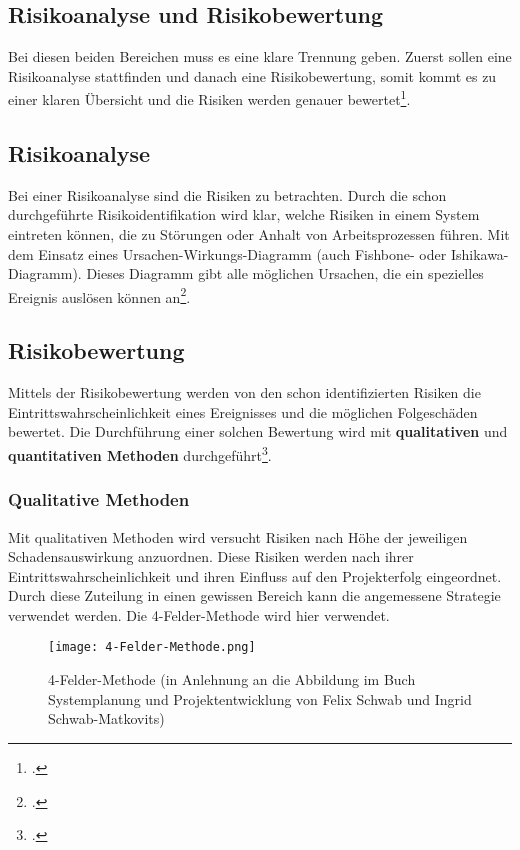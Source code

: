 \subsection{Risikoanalyse und Risikobewertung}
Bei diesen beiden Bereichen muss es eine klare Trennung geben. Zuerst sollen eine Risikoanalyse stattfinden und danach eine Risikobewertung, somit kommt es zu einer klaren Übersicht und die Risiken werden genauer bewertet\footcite{risikoanalyse}.


\subsection{Risikoanalyse}
Bei einer Risikoanalyse sind die Risiken zu betrachten. Durch die schon durchgeführte Risikoidentifikation wird klar, welche Risiken in einem System eintreten können, die zu Störungen oder Anhalt von Arbeitsprozessen führen. Mit dem Einsatz eines Ursachen-Wirkungs-Diagramm (auch Fishbone- oder Ishikawa-Diagramm). Dieses Diagramm gibt alle möglichen Ursachen, die ein spezielles Ereignis auslösen können an\footcite{risikomanagement-diplomarbeit}.


\subsection{Risikobewertung}
Mittels der Risikobewertung werden von den schon identifizierten Risiken die Eintrittswahrscheinlichkeit eines Ereignisses und die möglichen Folgeschäden bewertet. Die Durchführung einer solchen Bewertung wird mit \textbf{qualitativen} und \textbf{quantitativen Methoden} durchgeführt\footcite{risikomanagement-diplomarbeit}.

\subsubsection{Qualitative Methoden}
Mit qualitativen Methoden wird versucht Risiken nach Höhe der jeweiligen Schadensauswirkung anzuordnen.
Diese Risiken werden nach ihrer Eintrittswahrscheinlichkeit und ihren Einfluss auf den Projekterfolg eingeordnet. Durch diese Zuteilung in einen gewissen Bereich kann die angemessene Strategie verwendet werden. Die 4-Felder-Methode wird hier verwendet.

\begin{center}
\begin{figure}[H]
    \centering
    \texttt{[image: 4-Felder-Methode.png]}
    \caption{4-Felder-Methode (in Anlehnung an die Abbildung im Buch Systemplanung und Projektentwicklung von Felix Schwab und Ingrid Schwab-Matkovits)}
\end{figure}
\end{center}

